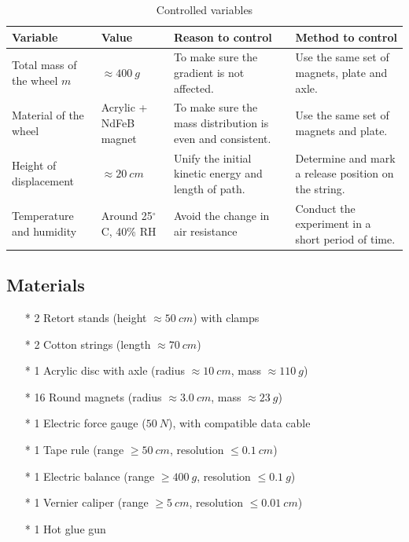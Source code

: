 \documentclass[a4paper]{article}
\begin{document}

\begin{table}[ht!]
\centering
\caption{Controlled variables}
\label{tab.control}
\begin{tabularx}{\textwidth}{p{2.0cm}p{1.5cm}XX}
\hline
Variable                    & Value                  & Reason to control                                          & Method to control                                    \\ \hline
Total mass of the wheel $m$ & $\approx \SI{400}{g}$  & To make sure the gradient is not affected.                 & Use the same set of magnets, plate and axle.         \\
Material of the wheel       & Acrylic + NdFeB magnet & To make sure the mass distribution is even and consistent. & Use the same set of magnets and plate.               \\
Height of displacement      & $\approx \SI{20}{cm}$  & Unify the initial kinetic energy and length of path.       & Determine and mark a release position on the string. \\ 
Temperature and humidity    & Around 25$^\circ$C, 40\% RH  & Avoid the change in air resistance                   & Conduct the experiment in a short period of time.    \\\hline
\end{tabularx}
\end{table}

\subsection{Materials}

\begin{itemize}
    \item[*] 2 Retort stands (height $\approx \SI{50}{cm}$) with clamps
    \item[*] 2 Cotton strings (length $\approx \SI{70}{cm}$)
    \item[*] 1 Acrylic disc with axle (radius $\approx \SI{10}{cm}$, mass $\approx \SI{110}{g}$)
    \item[*] 16 Round magnets (radius $\approx \SI{3.0}{cm}$, mass $\approx \SI{23}{g}$)
    \item[*] 1 Electric force gauge ($\SI{50}{N}$), with compatible data cable
    \item[*] 1 Tape rule (range $\ge \SI{50}{cm}$, resolution $\le \SI{0.1}{cm}$)
    \item[*] 1 Electric balance (range $\ge \SI{400}{g}$, resolution $\le \SI{0.1}{g}$)
    \item[*] 1 Vernier caliper (range $\ge \SI{5}{cm}$, resolution $\le \SI{0.01}{cm}$)
    \item[*] 1 Hot glue gun  
\end{itemize}
\end{document}

